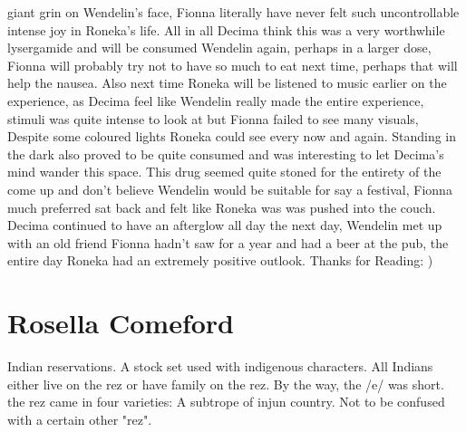 \documentclass[12pt]{book}
\begin{document}
giant grin on Wendelin's face, Fionna literally have never felt such uncontrollable intense joy in Roneka's life. All in all Decima think this was a very worthwhile lysergamide and will be consumed Wendelin again, perhaps in a larger dose, Fionna will probably try not to have so much to eat next time, perhaps that will help the nausea. Also next time Roneka will be listened to music earlier on the experience, as Decima feel like Wendelin really made the entire experience, stimuli was quite intense to look at but Fionna failed to see many visuals, Despite some coloured lights Roneka could see every now and again. Standing in the dark also proved to be quite consumed and was interesting to let Decima's mind wander this space. This drug seemed quite stoned for the entirety of the come up and don't believe Wendelin would be suitable for say a festival, Fionna much preferred sat back and felt like Roneka was was pushed into the couch. Decima continued to have an afterglow all day the next day, Wendelin met up with an old friend Fionna hadn't saw for a year and had a beer at the pub, the entire day Roneka had an extremely positive outlook. Thanks for Reading: )



\chapter{Rosella Comeford}

Indian reservations. A stock set used with indigenous characters. All Indians either live on the rez or have family on the rez. By the way, the /e/ was short. the rez came in four varieties: A subtrope of injun country. Not to be confused with a certain other "rez".
\end{document}
